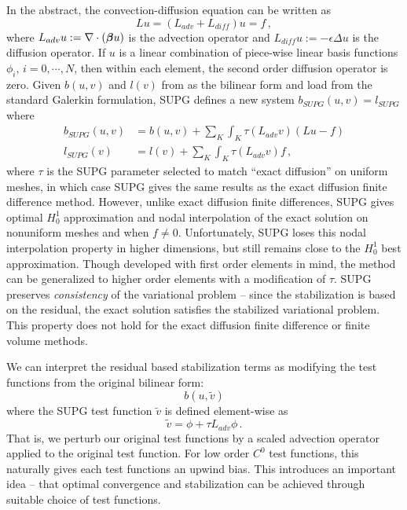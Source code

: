 \documentclass[Proposal.tex]{subfiles}
\begin{document}
In the abstract, the convection-diffusion equation can be written as 
\[
Lu=(L_{adv}+L_{diff})u=f\,,
\]
where $L_{adv}u:=\nabla\cdot(\boldsymbol\beta u)$ is the advection operator and $L_{diff}u:=-\epsilon\Delta u$ is the diffusion operator.
If $u$ is a linear combination of piece-wise linear basis functions $\phi_i,\,i=0,\cdots,N$, then within each element, the second order diffusion operator is zero.
Given $b(u,v)$ and $l(v)$ from as the bilinear form and load from the standard Galerkin formulation, SUPG defines a new system $b_{SUPG}(u,v)=l_{SUPG}$ where
\begin{align*}
	b_{SUPG}(u,v)&=b(u,v)+\sum_K\int_K\tau(L_{adv}v)(Lu-f)\\
	l_{SUPG}(v)&=l(v)+\sum_K\int_K\tau(L_{adv}v)f\,,
\end{align*}
where $\tau$ is the SUPG parameter selected to match ``exact diffusion'' on uniform meshes, in which case SUPG gives the same results as the 
exact diffusion finite difference method.
However, unlike exact diffusion finite differences, SUPG gives optimal $H_0^1$ approximation and nodal interpolation of the exact solution 
on nonuniform meshes and when $f\neq0$.
Unfortunately, SUPG loses this nodal interpolation property in higher dimensions, but still remains close to the $H_0^1$ best approximation.
Though developed with first order elements in mind, the method can be generalized to higher order elements with a modification of $\tau$.
SUPG preserves \emph{consistency} of the variational problem -- since the stabilization is based on the residual, the exact solution 
satisfies the stabilized variational problem. 
This property does not hold for the exact diffusion finite difference or finite volume methods.

We can interpret the residual based stabilization terms as modifying the test functions from the original bilinear form:
\[
b(u,\tilde v)
\]
where the SUPG test function $\tilde v$ is defined element-wise as
\[
\tilde v=\phi+\tau L_{adv}\phi\,.
\]
That is, we perturb our original test functions by a scaled advection operator applied to the original test function.
For low order $C^0$ test functions, this naturally gives each test functions an upwind bias.
This introduces an important idea -- that optimal convergence and stabilization can be achieved through suitable choice of test functions.
\end{document}
